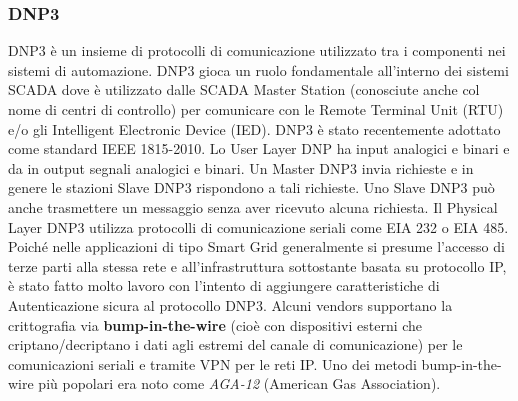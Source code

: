 \subsubsection{DNP3}
DNP3 è un insieme di protocolli di comunicazione utilizzato tra i componenti nei sistemi di automazione. DNP3 gioca un ruolo fondamentale all'interno dei sistemi SCADA dove è utilizzato dalle SCADA Master Station (conosciute anche col nome di centri di controllo) per comunicare con le Remote Terminal Unit (RTU) e/o gli Intelligent Electronic Device (IED). DNP3 è stato recentemente adottato come standard IEEE 1815-2010\cite{dnp}. Lo User Layer DNP ha input analogici e binari e da in output segnali analogici e binari. Un Master DNP3 invia richieste e in genere le stazioni Slave DNP3 rispondono a tali richieste. Uno Slave DNP3 può anche trasmettere un messaggio senza aver ricevuto alcuna richiesta. Il Physical Layer DNP3 utilizza protocolli di comunicazione seriali come EIA 232 o EIA 485. Poiché nelle applicazioni di tipo Smart Grid generalmente si presume l'accesso di terze parti alla stessa rete e all'infrastruttura sottostante basata su protocollo IP, è stato fatto molto lavoro con l'intento di aggiungere caratteristiche di Autenticazione sicura al protocollo DNP3. Alcuni vendors supportano la crittografia via \textbf{bump-in-the-wire} (cioè con dispositivi esterni che criptano/decriptano i dati agli estremi del canale di comunicazione) per le comunicazioni seriali e tramite VPN per le reti IP. Uno dei metodi bump-in-the-wire più popolari era noto come \emph{AGA-12} (American Gas Association).
